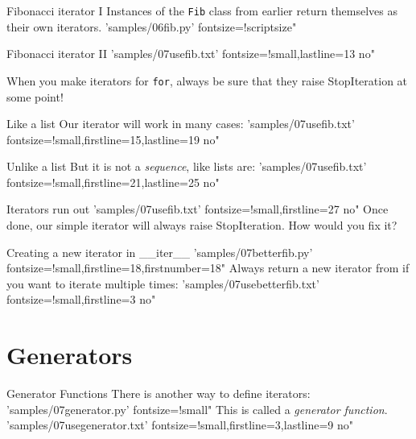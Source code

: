 \documentclass{pyslides}
\begin{document}
\begin{frame}[fragile]{Fibonacci iterator I}
Instances of the \texttt{Fib} class from earlier return themselves as their own iterators.
 'samples/06fib.py' fontsize=!scriptsize"
\end{frame}

\begin{frame}[fragile]{Fibonacci iterator II}
 'samples/07usefib.txt' fontsize=!small,lastline=13 no"

When you make iterators for \texttt{for}, always be sure that they raise StopIteration at some point!
\end{frame}

\begin{frame}[fragile]{Like a list}
Our iterator will work in many cases:
\bigskip
 'samples/07usefib.txt' fontsize=!small,firstline=15,lastline=19 no"
\end{frame}

\begin{frame}[fragile]{Unlike a list}
But it is not a \emph{sequence}, like lists are:
\bigskip
 'samples/07usefib.txt' fontsize=!small,firstline=21,lastline=25 no"
\end{frame}

\begin{frame}[fragile]{Iterators run out}
 'samples/07usefib.txt' fontsize=!small,firstline=27 no"
Once done, our simple iterator will always raise StopIteration. How would you fix it?
\end{frame}

\begin{frame}[fragile]{Creating a new iterator in \_\_iter\_\_}
 'samples/07betterfib.py' fontsize=!small,firstline=18,firstnumber=18"
Always return a new iterator from  if you want to iterate multiple times:
 'samples/07usebetterfib.txt' fontsize=!small,firstline=3 no"
\end{frame}

\section{Generators}

\begin{frame}[fragile]{Generator Functions}
There is another way to define iterators:
 'samples/07generator.py' fontsize=!small"
\bigskip
This is called a \emph{generator function}.
 'samples/07usegenerator.txt' fontsize=!small,firstline=3,lastline=9 no"
\end{frame}
\end{document}
